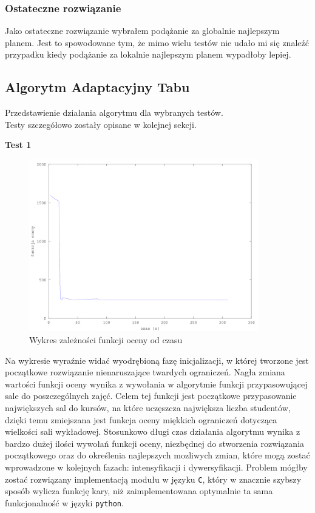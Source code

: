 \subsubsection{Ostateczne rozwiązanie}

\par Jako ostateczne rozwiązanie wybrałem podążanie za globalnie najlepszym planem. Jest to spowodowane tym, że mimo wielu testów nie udało mi się znaleźć przypadku kiedy podążanie za lokalnie najlepszym planem wypadłoby lepiej. 
\subsection{Algorytm Adaptacyjny Tabu}
Przedstawienie działania algorytmu dla wybranych testów.\\
Testy szczegółowo zostały opisane w kolejnej sekcji.
\par \textbf{Test 1}
\begin{figure}[H]
  \caption{Wykres zależności funkcji oceny od czasu}
  \centering
    \includegraphics[width=10cm]{ogolny.png}
\end{figure}
Na wykresie wyraźnie widać wyodrębioną fazę inicjalizacji, w której tworzone jest początkowe rozwiązanie nienaruszające twardych ograniczeń. Nagła zmiana wartości funkcji oceny wynika z wywołania w algorytmie funkcji przypasowującej sale do poszczególnych zajęć. Celem tej funkcji jest początkowe przypasowanie największych sal do kursów, na które uczęszcza największa liczba studentów, dzięki temu zmiejszana jest funkcja oceny miękkich ograniczeń dotycząca wielkości sali wykładowej. Stosunkowo długi czas działania algorytmu wynika z bardzo dużej ilości wywołań funkcji oceny, niezbędnej do stworzenia rozwiązania początkowego oraz do określenia najlepszych mozliwych zmian, które mogą zostać wprowadzone w kolejnych fazach: intensyfikacji i dywersyfikacji. Problem mógłby zostać rozwiązany implementacją modułu w języku \verb#C#, który w znacznie szybszy sposób wylicza funkcję kary, niż zaimplementowana optymalnie ta sama funkcjonalność w języki \verb#python#.
